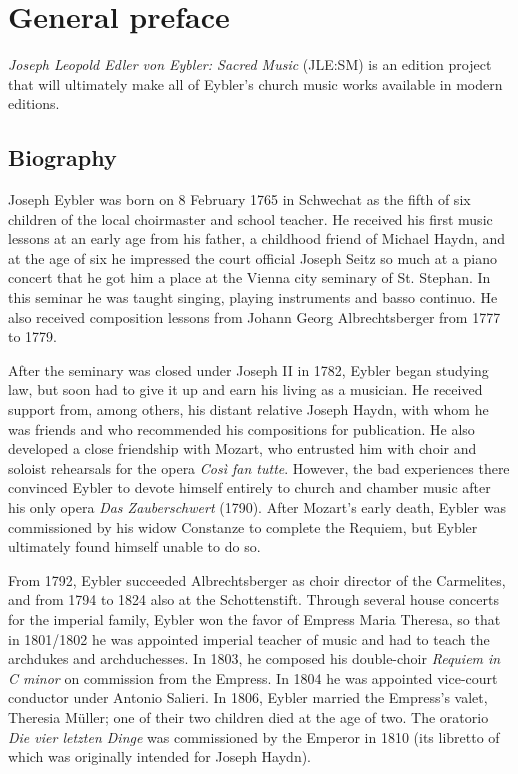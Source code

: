 \documentclass{ees}
\begin{document}

\setcounter{page}{1}


\chapter{General preface}

\textit{Joseph Leopold Edler von Eybler: Sacred Music} (JLE:SM) is an edition project that will ultimately make all of Eybler’s church music works available in modern editions.


\section{Biography}

Joseph Eybler was born on 8 February 1765 in Schwechat as the fifth of six children of the local choirmaster and school teacher. He received his first music lessons at an early age from his father, a childhood friend of Michael Haydn, and at the age of six he impressed the court official Joseph Seitz so much at a piano concert that he got him a place at the Vienna city seminary of St. Stephan. In this seminar he was taught singing, playing instruments and basso continuo. He also received composition lessons from Johann Georg Albrechtsberger from 1777 to 1779.

After the seminary was closed under Joseph II in 1782, Eybler began studying law, but soon had to give it up and earn his living as a musician. He received support from, among others, his distant relative Joseph Haydn, with whom he was friends and who recommended his compositions for publication. He also developed a close friendship with Mozart, who entrusted him with choir and soloist rehearsals for the opera \textit{Così fan tutte}. However, the bad experiences there convinced Eybler to devote himself entirely to church and chamber music after his only opera \textit{Das Zauberschwert} (1790). After Mozart's early death, Eybler was commissioned by his widow Constanze to complete the Requiem, but Eybler ultimately found himself unable to do so.

From 1792, Eybler succeeded Albrechtsberger as choir director of the Carmelites, and from 1794 to 1824 also at the Schottenstift. Through several house concerts for the imperial family, Eybler won the favor of Empress Maria Theresa, so that in 1801/1802 he was appointed imperial teacher of music and had to teach the archdukes and archduchesses. In 1803, he composed his double-choir \textit{Requiem in C minor} on commission from the Empress. In 1804 he was appointed vice-court conductor under Antonio Salieri. In 1806, Eybler married the Empress's valet, Theresia Müller; one of their two children died at the age of two. The oratorio \textit{Die vier letzten Dinge} was commissioned by the Emperor in 1810 (its libretto of which was originally intended for Joseph Haydn).
\end{document}
